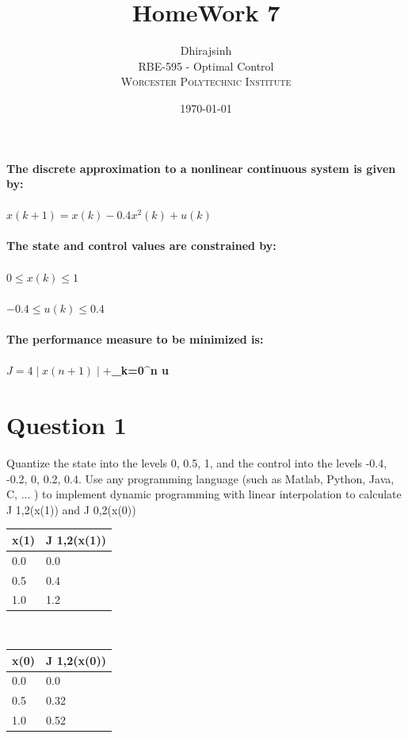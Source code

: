 \documentclass[12pt]{article}
\title{HomeWork 7} %
\author{Dhirajsinh\\ %
RBE-595 - Optimal Control\\ %
\textsc{Worcester Polytechnic Institute }
}
\date{\today} %
\begin{document}
\setlength{\droptitle}{-5em}    
\maketitle





\section*{}

{\bfseries The discrete approximation to a nonlinear continuous system is given by:\\ \\
$x(k + 1) = x(k) - 0.4x^2 (k) + u(k)$\\ \\
The state and control values are constrained by:\\ \\
$0 \leq x(k) \leq 1$\\ \\
$-0.4 \leq u(k) \leq 0.4$\\ \\
The performance measure to be minimized is:\\ \\
$ J = 4 \mid x(n+1) \mid + $\sum_{k=0}^{n} \mid u \mid $ $ \\

}



\section*{Question 1}
{Quantize the state into the levels 0, 0.5, 1, and the control into the levels -0.4, -0.2, 0, 0.2, 0.4.
Use any programming language (such as Matlab, Python, Java, C, ... ) to implement dynamic programming with linear interpolation to calculate J 1,2(x(1)) and J 0,2(x(0))}
\begin{tabular}{|l|l|}
\hline
x(1) & J 1,2(x(1)) \\ \hline
0.0  & 0.0         \\ \hline
0.5  & 0.4         \\ \hline
1.0  & 1.2         \\ \hline
\end{tabular}
\\
\begin{tabular}{|l|l|}
\hline
x(0) & J 1,2(x(0)) \\ \hline
0.0  & 0.0         \\ \hline
0.5  & 0.32        \\ \hline
1.0  & 0.52        \\ \hline
\end{tabular}
\end{document}
